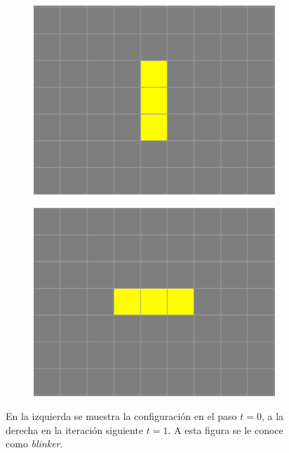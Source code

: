 \begin{figure}[h]
    \centering
    \begin{subfigure}{0.4\textwidth}
        \includegraphics[width=\textwidth]{images/life-1.png}
    \end{subfigure}
    \begin{subfigure}{0.4\textwidth}
        \includegraphics[width=\textwidth]{images/life-2.png}
    \end{subfigure}
    \caption{En la izquierda se muestra la configuraci\'on en el paso $t=0$, a la derecha en la iteraci\'on siguiente $t=1$. A esta figura se le conoce como \textit{blinker}.}
    \label{figure:blinker}
\end{figure}


